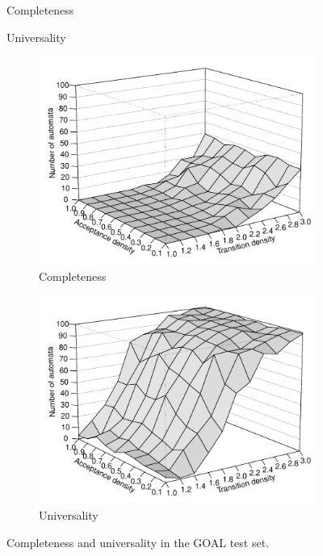 \begin{figure}
  \centering
  \hfill
  \renewcommand{\tabcolsep}{0.1cm}
  \begin{subtable}[t]{0.45\textwidth}
    \centering
    
    \caption{Completeness}
  \end{subtable}
  \hfill
  \begin{subtable}[t]{0.45\textwidth}
    \centering
    
    \caption{Universality}
  \end{subtable}
  \renewcommand{\tabcolsep}{0.2cm}
  \hfill

  \hfill
  \begin{subfigure}[t]{0.475\textwidth}
    \centering
    \includegraphics[width=\textwidth]{figures/r/completeness/persp.pdf}
    \caption{Completeness}
  \end{subfigure}
  \hfill
  \begin{subfigure}[t]{0.475\textwidth}
    \centering
    \includegraphics[width=\textwidth]{figures/r/universality/persp.pdf}
    \caption{Universality}
  \end{subfigure}
  \hfill
\caption{Completeness and universality in the GOAL test set.}
\end{figure}


